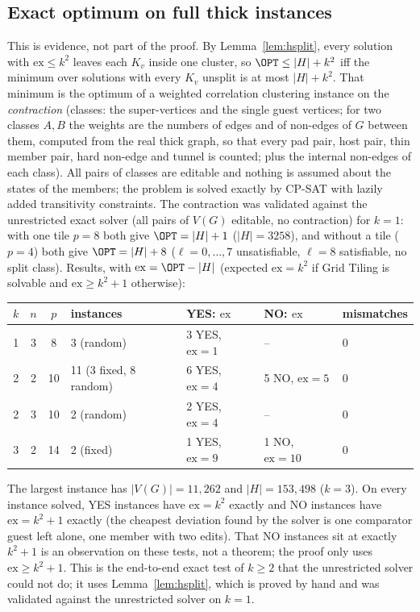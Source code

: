\subsection{Exact optimum on full thick instances}\label{sec:hexact}
This is evidence, not part of the proof. By Lemma~\ref{lem:hsplit}, every solution with $\mathrm{ex}\le k^2$ leaves each $K_v$ inside one cluster, so $\OPT\le|H|+k^2$ iff the minimum over solutions with every $K_v$ unsplit is at most $|H|+k^2$. That minimum is the optimum of a weighted correlation clustering instance on the \emph{contraction} (classes: the super-vertices and the single guest vertices; for two classes $A,B$ the weights are the numbers of edges and of non-edges of $G$ between them, computed from the real thick graph, so that every pad pair, host pair, thin member pair, hard non-edge and tunnel is counted; plus the internal non-edges of each class). All pairs of classes are editable and nothing is assumed about the states of the members; the problem is solved exactly by CP-SAT with lazily added transitivity constraints. The contraction was validated against the unrestricted exact solver (all pairs of $V(G)$ editable, no contraction) for $k=1$: with one tile $p=8$ both give $\OPT=|H|+1$ ($|H|=3258$), and without a tile ($p=4$) both give $\OPT=|H|+8$ ($\ell=0,\dots,7$ unsatisfiable, $\ell=8$ satisfiable, no split class). Results, with $\mathrm{ex}=\OPT-|H|$ (expected $\mathrm{ex}=k^2$ if Grid Tiling is solvable and $\mathrm{ex}\ge k^2+1$ otherwise):
\begin{center}
\small
\begin{tabular}{@{}cccllll@{}}
\hline
$k$ & $n$ & $p$ & instances & YES: $\mathrm{ex}$ & NO: $\mathrm{ex}$ & mismatches\\\hline
1 & 3 & 8 & 3 (random) & 3 YES, $\mathrm{ex}=1$ & -- & 0\\
2 & 2 & 10 & 11 (3 fixed, 8 random) & 6 YES, $\mathrm{ex}=4$ & 5 NO, $\mathrm{ex}=5$ & 0\\
2 & 3 & 10 & 2 (random) & 2 YES, $\mathrm{ex}=4$ & -- & 0\\
3 & 2 & 14 & 2 (fixed) & 1 YES, $\mathrm{ex}=9$ & 1 NO, $\mathrm{ex}=10$ & 0\\\hline
\end{tabular}
\end{center}
The largest instance has $|V(G)|=11{,}262$ and $|H|=153{,}498$ ($k=3$). On every instance solved, YES instances have $\mathrm{ex}=k^2$ exactly and NO instances have $\mathrm{ex}=k^2+1$ exactly (the cheapest deviation found by the solver is one comparator guest left alone, one member with two edits). That NO instances sit at exactly $k^2+1$ is an observation on these tests, not a theorem; the proof only uses $\mathrm{ex}\ge k^2+1$. This is the end-to-end exact test of $k\ge2$ that the unrestricted solver could not do; it uses Lemma~\ref{lem:hsplit}, which is proved by hand and was validated against the unrestricted solver on $k=1$.

